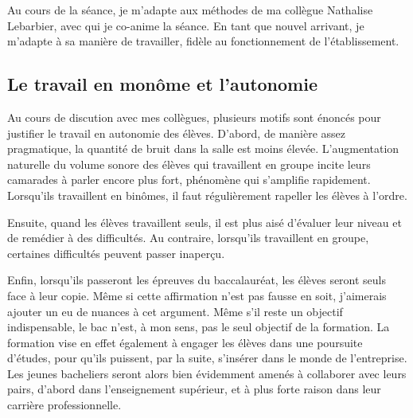 \documentclass[pdftex,a4paper,12pt]{article}
\begin{document}
	Au cours de la séance, je m'adapte aux méthodes de ma collègue Nathalise Lebarbier, avec qui je co-anime la séance.
	En tant que nouvel arrivant, je m'adapte à sa manière de travailler, fidèle au fonctionnement de l'établissement.

	\subsection{Le travail en monôme et l'autonomie}

	Au cours de discution avec mes collègues, plusieurs motifs sont énoncés pour justifier le travail en autonomie des élèves.
	D'abord, de manière assez pragmatique, la quantité de bruit dans la salle est moins élevée. 
	L'augmentation naturelle du volume sonore des élèves qui travaillent en groupe incite leurs camarades à parler encore plus fort, phénomène qui s'amplifie rapidement. 
	Lorsqu'ils travaillent en binômes, il faut régulièrement rapeller les élèves à l'ordre.

	Ensuite, quand les élèves travaillent seuls, il est plus aisé d'évaluer leur niveau et de remédier à des difficultés. 
	Au contraire, lorsqu'ils travaillent en groupe, certaines difficultés peuvent passer inaperçu.

	Enfin, lorsqu'ils passeront les épreuves du baccalauréat, les élèves seront seuls face à leur copie.
	Même si cette affirmation n'est pas fausse en soit, j'aimerais ajouter un eu de nuances à cet argument.
	Même s'il reste un objectif indispensable, le bac n'est, à mon sens, pas le seul objectif de la formation.
	La formation vise en effet également à engager les élèves dans une poursuite d'études, pour qu'ils puissent, par la suite, s'insérer dans le monde de l'entreprise.
	Les jeunes bacheliers seront alors bien évidemment amenés à collaborer avec leurs pairs, 
	d'abord dans l'enseignement supérieur, et à plus forte raison dans leur carrière professionnelle.\\
\end{document}

